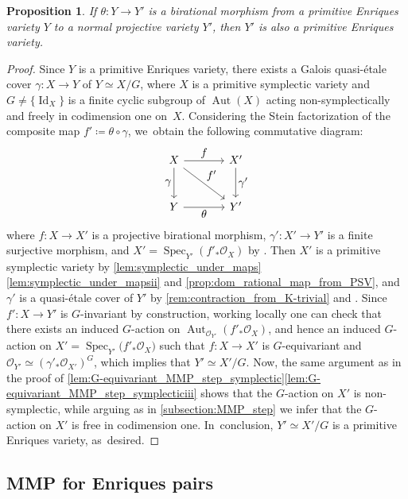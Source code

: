 \documentclass[JEP,XML,SOM,Unicode,published]{cedram}
\let\ts\textstyle
\theoremstyle{plain}
\newtheorem{prop}[thm]{Proposition}
\theoremstyle{definition}
\newcommand{\OO}{\mathcal{O}}
\DeclareMathOperator{\Id}{Id}
\DeclareMathOperator{\Aut}{Aut}
\DeclareMathOperator{\Spec}{Spec}
\begin{document}
\begin{prop}
\label{prop:PEV_closed_under_bir_contraction}
If $\theta \colon Y\to Y'$ is a birational morphism from a primitive Enriques variety $Y$ to a normal projective variety $Y'$, then $Y'$ is also a primitive Enriques variety.
\end{prop}

\begin{proof}
Since $Y$ is a primitive Enriques variety, there exists a Galois quasi-étale cover $\gamma \colon X \to Y$ of $Y \simeq X / G$, where $X$ is a primitive symplectic variety and $G \neq \{ \Id_X \}$ is a finite cyclic subgroup of $\Aut(X)$ acting non-symplectically and freely in codimension one on~$X$. Considering the Stein factorization of the composite map $f' \coloneqq \theta \circ \gamma$, we~obtain the following commutative diagram:
\[
\begin{tikzcd}[row sep = large, column sep = large]
X \arrow[r, "\ts f"] \arrow[d, "\ts \gamma", swap] \arrow[dr,"\ts f'"]& X' \arrow[d, "\ts \gamma'"] \\
Y \arrow[r, "\ts \theta" swap] & Y'
\end{tikzcd}
\]
where $ f \colon X \to X'$ is a projective birational morphism, $\gamma' \colon X' \to Y'$ is a finite surjective morphism, and $X' = \Spec_{Y'} (f'_* \OO_X)$ by \cite[Prop.\,37.53.4(5)]{Stacks}. Then $X'$ is a primitive symplectic variety by \autoref{lem:symplectic_under_maps}\eqref{lem:symplectic_under_mapsii} and \autoref{prop:dom_rational_map_from_PSV}, and $\gamma'$ is a quasi-étale cover of $Y'$ by \autoref{rem:contraction_from_K-trivial} and \cite[\S1.41]{Debarre01book}.
Since $f' \colon X \to Y'$ is $G$\nobreakdash-invariant by construction, working locally one can check that there exists an induced $G$\nobreakdash-action on $\Aut_{\OO_{Y'}} (f'_* \OO_X)$, and hence an induced $G$\nobreakdash-action on $X' = \Spec_{Y'} \bigl(f'_* \OO_X \bigr)$ such that $f \colon X \to X'$ is $G$\nobreakdash-equivariant and $\OO_{Y'}\simeq (\gamma'_* \OO_{X'})^G$, which implies that $Y' \simeq X'/G$.
Now, the same argument as in the proof of \autoref{lem:G-equivariant_MMP_step_symplectic}\eqref{lem:G-equivariant_MMP_step_symplecticiii} shows that the $G$\nobreakdash-action on $X'$ is non-symplectic, while arguing as in \autoref{subsection:MMP_step} we infer that the $G$\nobreakdash-action on $X'$ is free in codimension one. In~conclusion, $Y' \simeq X'/G$ is a primitive Enriques variety, as~desired.
\end{proof}

\subsection{MMP for Enriques pairs}
\label{subsection:MMP_Enriques}
\end{document}
